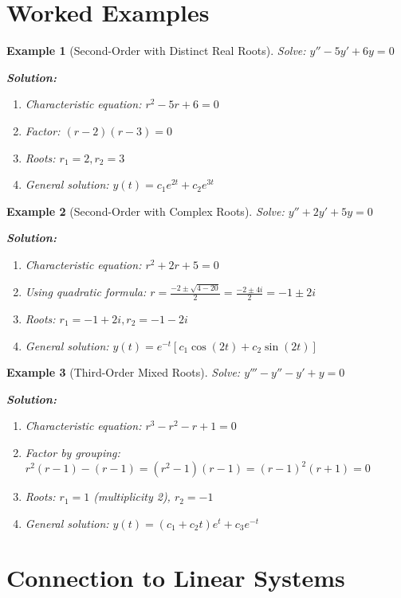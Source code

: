 \documentclass[12pt]{article}
\newtheorem{example}{Example}
\begin{document}
\section{Worked Examples}

\begin{example}[Second-Order with Distinct Real Roots]
Solve: $y'' - 5y' + 6y = 0$

\textbf{Solution:}
\begin{enumerate}
    \item Characteristic equation: $r^2 - 5r + 6 = 0$
    \item Factor: $(r-2)(r-3) = 0$
    \item Roots: $r_1 = 2, r_2 = 3$
    \item General solution: $y(t) = c_1 e^{2t} + c_2 e^{3t}$
\end{enumerate}
\end{example}

\begin{example}[Second-Order with Complex Roots]
Solve: $y'' + 2y' + 5y = 0$

\textbf{Solution:}
\begin{enumerate}
    \item Characteristic equation: $r^2 + 2r + 5 = 0$
    \item Using quadratic formula: $r = \frac{-2 \pm \sqrt{4-20}}{2} = \frac{-2 \pm 4i}{2} = -1 \pm 2i$
    \item Roots: $r_1 = -1 + 2i, r_2 = -1 - 2i$
    \item General solution: $y(t) = e^{-t}[c_1 \cos(2t) + c_2 \sin(2t)]$
\end{enumerate}
\end{example}

\begin{example}[Third-Order Mixed Roots]
Solve: $y''' - y'' - y' + y = 0$

\textbf{Solution:}
\begin{enumerate}
    \item Characteristic equation: $r^3 - r^2 - r + 1 = 0$
    \item Factor by grouping: $r^2(r-1) - (r-1) = (r^2-1)(r-1) = (r-1)^2(r+1) = 0$
    \item Roots: $r_1 = 1$ (multiplicity 2), $r_2 = -1$
    \item General solution: $y(t) = (c_1 + c_2 t)e^t + c_3 e^{-t}$
\end{enumerate}
\end{example}

\section{Connection to Linear Systems}
\end{document}
